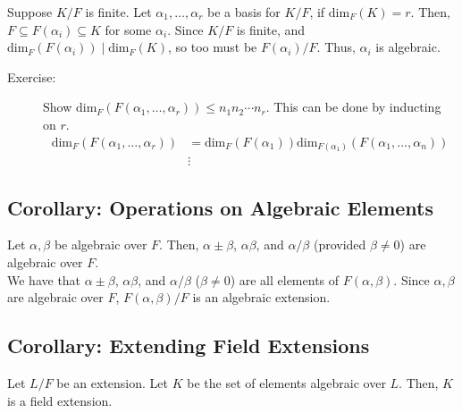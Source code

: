 \documentclass[10pt]{extarticle}
\begin{document}
  Suppose $K/F$ is finite. Let $\alpha_1,\dots,\alpha_r$ be a basis for $K/F$, if $\text{dim}_{F}(K) = r$. Then, $F\subseteq F(\alpha_i) \subseteq K$ for some $\alpha_i$. Since $K/F$ is finite, and $\text{dim}_{F}(F(\alpha_i)) \mid \text{dim}_{F}(K)$, so too must be $F(\alpha_i)/F$. Thus, $\alpha_i$ is algebraic.
  \begin{description}
    \item[Exercise:] Show $\text{dim}_{F}(F(\alpha_1,\dots,\alpha_r)) \leq n_1n_2\cdots n_r$. This can be done by inducting on $r$.
      \begin{align*}
        \text{dim}_{F}(F(\alpha_1,\dots,\alpha_r)) &= \text{dim}_{F}(F(\alpha_1))\text{dim}_{F(\alpha_1)}(F(\alpha_1,\dots,\alpha_n))\\
                                                   &\vdots
      \end{align*}
  \end{description}
  \subsection{Corollary: Operations on Algebraic Elements}%
  Let $\alpha,\beta$ be algebraic over $F$. Then, $\alpha\pm\beta$, $\alpha\beta$, and $\alpha/\beta$ (provided $\beta \neq 0$) are algebraic over $F$.\\

  We have that $\alpha\pm\beta$, $\alpha\beta$, and $\alpha/\beta$ ($\beta \neq 0$) are all elements of $F(\alpha,\beta)$. Since $\alpha,\beta$ are algebraic over $F$, $F(\alpha,\beta)/F$ is an algebraic extension.
  \subsection{Corollary: Extending Field Extensions}%
  Let $L/F$ be an extension. Let $K$ be the set of elements algebraic over $L$. Then, $K$ is a field extension.
\end{document}
